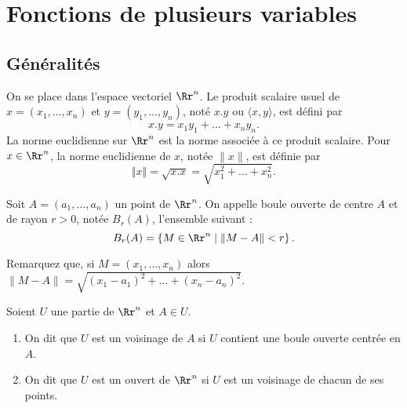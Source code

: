 \documentclass[class=report,crop=false]{standalone}
\begin{document}


\newcommand {\e}{{\rm e}}
\newcommand{\ja}{\mathrm{J}}
\newcommand{\jac}{\mathrm{Jac}}
\renewcommand{\d}{\,\mathrm{d}}
\newcommand {\Rrot}{{\rm rot}}
\newcommand{\aire}{{\rm Aire}}
\newcommand{\vol}{{\rm Vol}}





\tableofcontents




\chapter{\bf Fonctions de plusieurs variables}
\section{Généralités}

\thispagestyle{empty}

\vskip4mm

\noindent On se place dans l'espace vectoriel $\Rr^n$. Le produit scalaire usuel de $x=(x_1,\dots ,x_n)$ et $y=(y_1,\dots ,y_n)$, noté $x.y$ ou $\langle x,y\rangle$, est défini par
$$x.y=x_1y_1+\dots +x_ny_n.$$
La norme euclidienne sur $\Rr^n$ est la norme associée à ce produit scalaire. Pour $x\in \Rr^n$, la norme euclidienne de $x$, notée $\| x\|$, est définie par
$$\Vert x\Vert =\sqrt{x.x}=\sqrt{x_1^2+\dots +x_n^2}.$$

\vskip4mm

\begin{definition}Soit $A=(a_1,\dots ,a_n)$ un point de $\Rr^n$. On appelle boule ouverte de centre $A$ et de rayon $r>0$, notée $B_r(A)$, l'ensemble suivant :
$$B_r(A)=\left\{M\in \Rr^n\mid \|M-A\|<r\right\}.$$
\end{definition}

\vskip4mm

\noindent Remarquez que, si $M=(x_1,\dots ,x_n)$ alors $\|M-A\|=\sqrt{(x_1-a_1)^2+\dots +(x_n-a_n)^2}$.

\vskip6mm

\begin{definition} Soient $U$ une partie de $\Rr^n$ et $A\in U$.
\begin{enumerate}
\item On dit que $U$ est un voisinage de $A$ si $U$ contient une boule ouverte centrée en $A$.
\item On dit que $U$ est un ouvert de $\Rr^n$ si $U$ est un voisinage de chacun de ses points.
\end{enumerate}
\end{definition}
\end{document}
